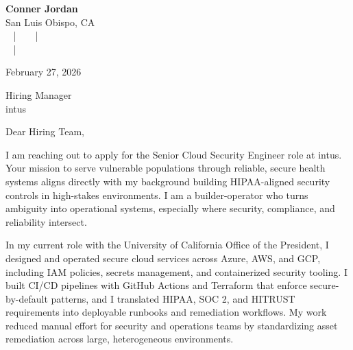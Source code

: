 \documentclass[letterpaper,11pt]{article}
\newcommand{\companyname}{intus}
\begin{document}
\begin{center}
  {\Huge \textbf{Conner Jordan}}\\[4pt]
  {\Large San Luis Obispo, CA}\\[4pt]
  \href{tel:+18059759793}{
    } ~ | ~
  \href{mailto:connercharlesjordan@gmail.com}{
    } ~ | ~
   \\
  \href{https://www.linkedin.com/in/conner-jordan-4b268514a/}{
    } ~ | ~
  \href{https://github.com/cjordan223}{
    }
\end{center}

\vspace{16pt}

\begin{flushright}
February 27, 2026
\end{flushright}

Hiring Manager\\
\companyname

\vspace{26pt}

\noindent
Dear Hiring Team,

\vspace{16pt}

I am reaching out to apply for the Senior Cloud Security Engineer role at \companyname. Your mission to serve vulnerable populations through reliable, secure health systems aligns directly with my background building HIPAA-aligned security controls in high-stakes environments. I am a builder-operator who turns ambiguity into operational systems, especially where security, compliance, and reliability intersect.

\vspace{16pt}

In my current role with the University of California Office of the President, I designed and operated secure cloud services across Azure, AWS, and GCP, including IAM policies, secrets management, and containerized security tooling. I built CI/CD pipelines with GitHub Actions and Terraform that enforce secure-by-default patterns, and I translated HIPAA, SOC 2, and HITRUST requirements into deployable runbooks and remediation workflows. My work reduced manual effort for security and operations teams by standardizing asset remediation across large, heterogeneous environments.
\end{document}

